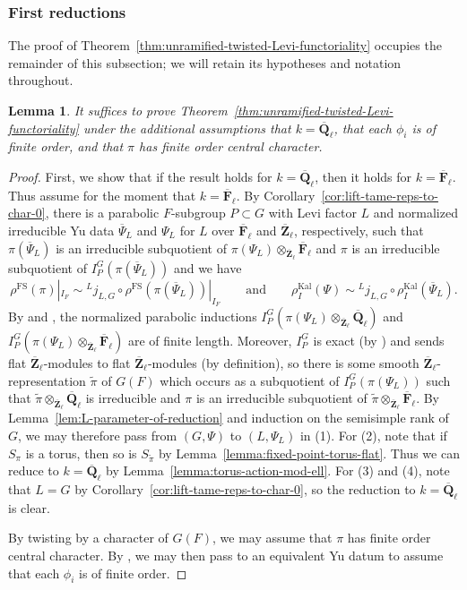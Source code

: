 \documentclass[reqno]{amsart}
\numberwithin{equation}{subsection}
\newcommand{\F}{\mathbf{F}}
\newcommand{\wt}[1]{\widetilde{#1}}
\newcommand{\Q}{\mathbf{Q}}
\newcommand{\Z}{\mathbf{Z}}
\newcommand{\ol}[1]{\overline{#1}}
\newcommand{\ld}{{}^L}
\DeclareMathOperator{\FS}{FS}
\DeclareMathOperator{\Kal}{Kal}
\newtheorem{lemma}[thm]{Lemma}
\theoremstyle{remark}
\numberwithin{equation}{subsection}
\numberwithin{figure}{subsection}
\begin{document}
\subsubsection{First reductions}\label{sss:levi-functoriality-setting}

The proof of Theorem~\ref{thm:unramified-twisted-Levi-functoriality} occupies the remainder of this subsection; we will retain its hypotheses and notation throughout.

\begin{lemma}\label{lemma:unram-twisted-levi-first-reductions}
    It suffices to prove Theorem~\ref{thm:unramified-twisted-Levi-functoriality} under the additional assumptions that $k = \ol\Q_\ell$, that each $\phi_i$ is of finite order, and that $\pi$ has finite order central character.
\end{lemma}

\begin{proof}
    First, we show that if the result holds for $k = \ol\Q_\ell$, then it holds for $k = \ol\F_\ell$. Thus assume for the moment that $k = \ol\F_\ell$. By Corollary~\ref{cor:lift-tame-reps-to-char-0}, there is a parabolic $F$-subgroup $P \subset G$ with Levi factor $L$ and normalized irreducible Yu data $\ol\Psi_L$ and $\Psi_L$ for $L$ over $\ol\F_\ell$ and $\ol\Z_\ell$, respectively, such that $\pi(\ol\Psi_L)$ is an irreducible subquotient of $\pi(\Psi_L) \otimes_{\ol\Z_\ell} \ol\F_\ell$ and $\pi$ is an irreducible subquotient of $I_P^G(\pi(\ol\Psi_L))$ and we have
    \[
    \rho^{\FS}(\pi)|_{I_F} \sim \ld j_{L,G} \circ \rho^{\FS}(\pi(\ol\Psi_L))|_{I_F}
    \qquad\text{and}\qquad
    \rho_I^{\Kal}(\Psi) \sim \ld j_{L,G} \circ \rho_I^{\Kal}(\ol\Psi_L).
    \]
    By \cite[Chapitre II, no.\ 2.1]{Vig96} and \cite[Corollary 1.5(1)]{DHKM}, the normalized parabolic inductions $I_P^G(\pi(\Psi_L) \otimes_{\ol\Z_\ell} \ol\Q_\ell)$ and $I_P^G(\pi(\Psi_L) \otimes_{\ol\Z_\ell} \ol\F_\ell)$ are of finite length. Moreover, $I_P^G$ is exact (by \cite[Chapitre II, no.\ 2.1]{Vig96}) and sends flat $\ol\Z_\ell$-modules to flat $\ol\Z_\ell$-modules (by definition), so there is some smooth $\ol\Z_\ell$-representation $\wt\pi$ of $G(F)$ which occurs as a subquotient of $I_P^G(\pi(\Psi_L))$ such that $\wt\pi \otimes_{\ol\Z_\ell} \ol\Q_\ell$ is irreducible and $\pi$ is an irreducible subquotient of $\wt\pi \otimes_{\ol\Z_\ell} \ol\F_\ell$. By Lemma~\ref{lem:L-parameter-of-reduction} and induction on the semisimple rank of $G$, we may therefore pass from $(G, \Psi)$ to $(L, \Psi_L)$ in (1). For (2), note that if $S_\pi$ is a torus, then so is $S_{\wt\pi}$ by Lemma~\ref{lemma:fixed-point-torus-flat}. Thus we can reduce to $k = \ol\Q_\ell$ by Lemma~\ref{lemma:torus-action-mod-ell}. For (3) and (4), note that $L = G$ by Corollary~\ref{cor:lift-tame-reps-to-char-0}, so the reduction to $k = \ol\Q_\ell$ is clear.

    By twisting by a character of $G(F)$, we may assume that $\pi$ has finite order central character. By \cite[Lemmas~6.6.1, Proposition~6.6.3, and 6.6.5]{CF26a}, we may then pass to an equivalent Yu datum to assume that each $\phi_i$ is of finite order.
\end{proof}
\end{document}
